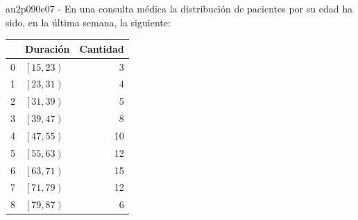 \documentclass[spanish, 11pt]{exam}
\begin{document}
\begin{questions}
\begin{multicols}{1}
\begin{parts}
        \end{parts}
        \end{multicols}
        \question au2p090e07 - En una consulta médica la distribución de pacientes por su edad ha sido, en la última semana, la siguiente:\\\begin{tabular}{rlr}
\hline
    & Duración              &   Cantidad \\
\hline
  0 & $\left[15, 23\right)$ &          3 \\
  1 & $\left[23, 31\right)$ &          4 \\
  2 & $\left[31, 39\right)$ &          5 \\
  3 & $\left[39, 47\right)$ &          8 \\
  4 & $\left[47, 55\right)$ &         10 \\
  5 & $\left[55, 63\right)$ &         12 \\
  6 & $\left[63, 71\right)$ &         15 \\
  7 & $\left[71, 79\right)$ &         12 \\
  8 & $\left[79, 87\right)$ &          6 \\
\hline
\end{tabular}
        \begin{multicols}{1}
\end{multicols}
\end{questions}
\end{document}
